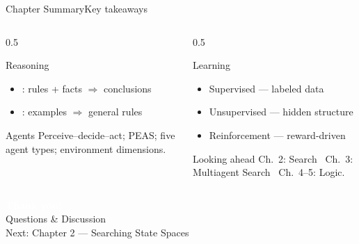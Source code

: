 \documentclass[aspectratio=169,11pt]{beamer}
\begin{document}
\begin{frame}{Chapter Summary}{Key takeaways}
  \begin{columns}[T]
    \begin{column}{0.5\textwidth}
      \begin{block}{Reasoning}
        \small
        \begin{itemize}
          \item {}: rules + facts $\Rightarrow$ conclusions
          \item {}: examples $\Rightarrow$ general rules
        \end{itemize}
      \end{block}
      \begin{block}{Agents}
        \small Perceive–decide–act; PEAS; five agent types; environment dimensions.
      \end{block}
    \end{column}
    \begin{column}{0.5\textwidth}
      \begin{exampleblock}{Learning}
        \small
        \begin{itemize}
          \item Supervised — labeled data
          \item Unsupervised — hidden structure
          \item Reinforcement — reward-driven
        \end{itemize}
      \end{exampleblock}
      \begin{alertblock}{Looking ahead}
        \small Ch.\ 2: Search \textbullet\ Ch.\ 3: Multiagent Search \textbullet\ Ch.\ 4–5: Logic.
      \end{alertblock}
    \end{column}
  \end{columns}
\end{frame}

{
\begin{frame}
  \vfill
  \begin{center}
    {\LARGE\textcolor{white}{\textbf{Thank you!}}}\\[0.6em]
    {\small\textcolor{PrimaryLight}{Questions \& Discussion}}\\[1.2em]
    {\footnotesize\textcolor{AccentYellow}{Next: Chapter 2 — Searching State Spaces}}
  \end{center}
  \vfill
\end{frame}}
\end{document}
